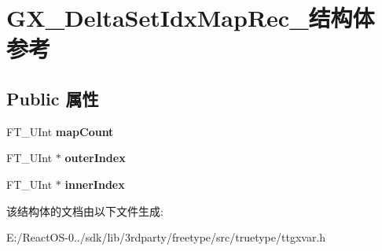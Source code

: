 \hypertarget{struct_g_x___delta_set_idx_map_rec__}{}\section{G\+X\+\_\+\+Delta\+Set\+Idx\+Map\+Rec\+\_\+结构体 参考}
\label{struct_g_x___delta_set_idx_map_rec__}
\subsection*{Public 属性}
\begin{DoxyCompactItemize}
\item 
\mbox{\label{struct_g_x___delta_set_idx_map_rec___ad626649b9c2c17ef3ea57a55c3ee05c9}} 
F\+T\+\_\+\+U\+Int {\bfseries map\+Count}
\item 
\mbox{\label{struct_g_x___delta_set_idx_map_rec___aac71ab5a1c798a7733223042b48f4a99}} 
F\+T\+\_\+\+U\+Int $\ast$ {\bfseries outer\+Index}
\item 
\mbox{\label{struct_g_x___delta_set_idx_map_rec___abd87bb36b581f25516e4de44959e8b9f}} 
F\+T\+\_\+\+U\+Int $\ast$ {\bfseries inner\+Index}
\end{DoxyCompactItemize}


该结构体的文档由以下文件生成\+:\begin{DoxyCompactItemize}
\item 
E\+:/\+React\+O\+S-\/0../sdk/lib/3rdparty/freetype/src/truetype/ttgxvar.\+h\end{DoxyCompactItemize}
